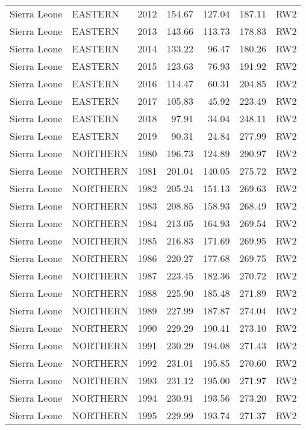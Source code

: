 \begin{longtable}{lllrrrl}
  Sierra Leone & EASTERN & 2012 & 154.67 & 127.04 & 187.11 & RW2 \\ 
  Sierra Leone & EASTERN & 2013 & 143.66 & 113.73 & 178.83 & RW2 \\ 
  Sierra Leone & EASTERN & 2014 & 133.22 & 96.47 & 180.26 & RW2 \\ 
  Sierra Leone & EASTERN & 2015 & 123.63 & 76.93 & 191.92 & RW2 \\ 
  Sierra Leone & EASTERN & 2016 & 114.47 & 60.31 & 204.85 & RW2 \\ 
  Sierra Leone & EASTERN & 2017 & 105.83 & 45.92 & 223.49 & RW2 \\ 
  Sierra Leone & EASTERN & 2018 & 97.91 & 34.04 & 248.11 & RW2 \\ 
  Sierra Leone & EASTERN & 2019 & 90.31 & 24.84 & 277.99 & RW2 \\ 
  Sierra Leone & NORTHERN & 1980 & 196.73 & 124.89 & 290.97 & RW2 \\ 
  Sierra Leone & NORTHERN & 1981 & 201.04 & 140.05 & 275.72 & RW2 \\ 
  Sierra Leone & NORTHERN & 1982 & 205.24 & 151.13 & 269.63 & RW2 \\ 
  Sierra Leone & NORTHERN & 1983 & 208.85 & 158.93 & 268.49 & RW2 \\ 
  Sierra Leone & NORTHERN & 1984 & 213.05 & 164.93 & 269.54 & RW2 \\ 
  Sierra Leone & NORTHERN & 1985 & 216.83 & 171.69 & 269.95 & RW2 \\ 
  Sierra Leone & NORTHERN & 1986 & 220.27 & 177.68 & 269.75 & RW2 \\ 
  Sierra Leone & NORTHERN & 1987 & 223.45 & 182.36 & 270.72 & RW2 \\ 
  Sierra Leone & NORTHERN & 1988 & 225.90 & 185.48 & 271.89 & RW2 \\ 
  Sierra Leone & NORTHERN & 1989 & 227.99 & 187.87 & 274.04 & RW2 \\ 
  Sierra Leone & NORTHERN & 1990 & 229.29 & 190.41 & 273.10 & RW2 \\ 
  Sierra Leone & NORTHERN & 1991 & 230.29 & 194.08 & 271.43 & RW2 \\ 
  Sierra Leone & NORTHERN & 1992 & 231.01 & 195.85 & 270.60 & RW2 \\ 
  Sierra Leone & NORTHERN & 1993 & 231.12 & 195.00 & 271.97 & RW2 \\ 
  Sierra Leone & NORTHERN & 1994 & 230.91 & 193.56 & 273.20 & RW2 \\ 
  Sierra Leone & NORTHERN & 1995 & 229.99 & 193.74 & 271.37 & RW2 \\ 

\end{longtable}
